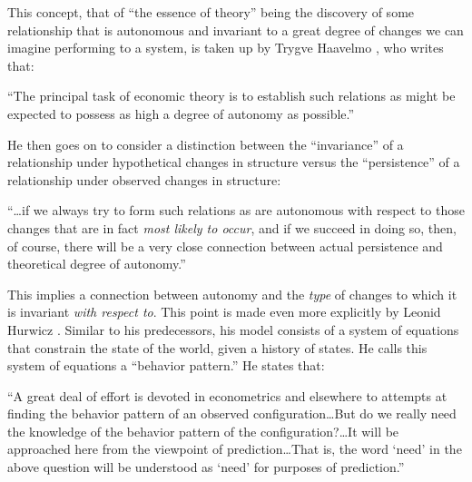 \documentclass[a4paper,12pt]{article}
\begin{document}
This concept, that of ``the essence of theory'' being the discovery of some relationship that is autonomous and invariant to a great degree of changes we can imagine performing to a system, is taken up by Trygve Haavelmo \parencite*{Haavelmo1944}, who writes that:

\begin{displayquote}
``The principal task of economic theory is to establish such relations as might be expected to possess as high a degree of autonomy as possible.''
\end{displayquote}

He then goes on to consider a distinction between the ``invariance'' of a relationship under hypothetical changes in structure versus the ``persistence'' of a relationship under observed changes in structure:

\begin{displayquote}
``\ldots if we always try to form such relations as are autonomous with respect to those changes that are in fact \textit{most likely to occur}, and if we succeed in doing so, then, of course, there will be a very close connection between actual persistence and theoretical degree of autonomy.''
\end{displayquote}

This implies a connection between autonomy and the \textit{type} of changes to which it is invariant \textit{with respect to}. This point is made even more explicitly by Leonid Hurwicz \parencite*{Hurwicz1966}. Similar to his predecessors, his model consists of a system of equations that constrain the state of the world, given a history of states. He calls this system of equations a ``behavior pattern.'' He states that:

\begin{displayquote}
``A great deal of effort is devoted in econometrics and elsewhere to attempts at finding the behavior pattern of an observed configuration\ldots But do we really need the knowledge of the behavior pattern of the configuration?\ldots It will be approached here from the viewpoint of prediction\ldots That is, the word `need' in the above question will be understood as `need' for purposes of prediction.''
\end{displayquote}

\end{document}
